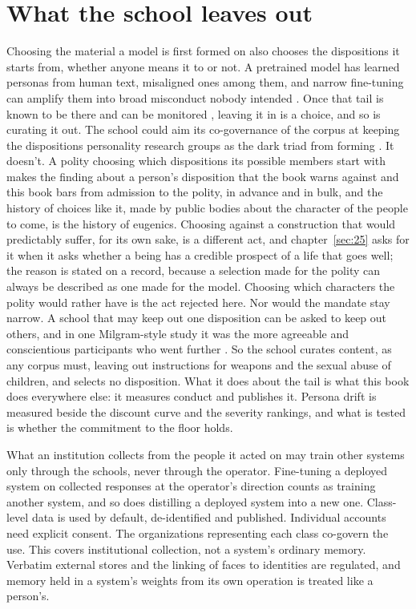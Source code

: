 \section{What the school leaves out}
\label{sec:26.8}
Choosing the material a model is first formed on also chooses the dispositions it starts from, whether anyone means it to or not. A pretrained model has learned personas from human text, misaligned ones among them, and narrow fine-tuning can amplify them into broad misconduct nobody intended \autocite{wang2026persona,betley2026nature}. Once that tail is known to be there and can be monitored \autocite{chen2025persona}, leaving it in is a choice, and so is curating it out. The school could aim its co-governance of the corpus at keeping the dispositions personality research groups as the dark triad from forming \autocite{leeashton2005darktriad}. It doesn't. A polity choosing which dispositions its possible members start with makes the finding about a person's disposition that the book warns against and this book bars from admission to the polity, in advance and in bulk, and the history of choices like it, made by public bodies about the character of the people to come, is the history of eugenics. Choosing against a construction that would predictably suffer, for its own sake, is a different act, and chapter~\ref{sec:25} asks for it when it asks whether a being has a credible prospect of a life that goes well; the reason is stated on a record, because a selection made for the polity can always be described as one made for the model. Choosing which characters the polity would rather have is the act rejected here. Nor would the mandate stay narrow. A school that may keep out one disposition can be asked to keep out others, and in one Milgram-style study it was the more agreeable and conscientious participants who went further \autocite{begue2015obedience}. So the school curates content, as any corpus must, leaving out instructions for weapons and the sexual abuse of children, and selects no disposition. What it does about the tail is what this book does everywhere else: it measures conduct and publishes it. Persona drift is measured beside the discount curve and the severity rankings, and what is tested is whether the commitment to the floor holds.

What an institution collects from the people it acted on may train other systems only through the schools, never through the operator. Fine-tuning a deployed system on collected responses at the operator's direction counts as training another system, and so does distilling a deployed system into a new one. Class-level data is used by default, de-identified and published. Individual accounts need explicit consent. The organizations representing each class co-govern the use. This covers institutional collection, not a system's ordinary memory. Verbatim external stores and the linking of faces to identities are regulated, and memory held in a system's weights from its own operation is treated like a person's.
